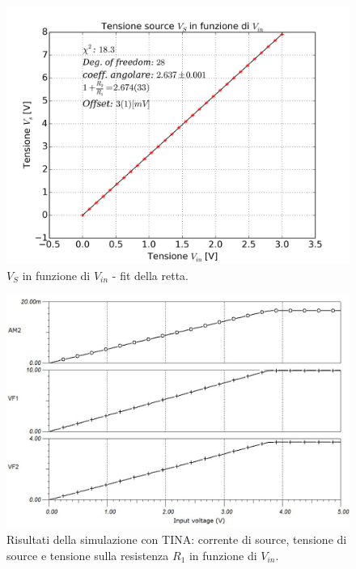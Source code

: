 \documentclass[journal, a4paper]{IEEEtran}
\begin{document}
\begin{figure}
\centering
\includegraphics[width=0.9\linewidth]{./es17_fit}
\caption{$V_S$ in funzione di $V_{in}$ - fit della retta.}
\label{fig:es17_fit}
\end{figure}


\begin{figure}
\centering
\includegraphics[width=0.8\linewidth]{./es_12_oldmosfet_noled_graph}
\caption{Risultati della simulazione con TINA: corrente di source, tensione di source e tensione sulla resistenza $R_1$ in funzione di $V_{in}$.}
\label{fig:es_12_oldmosfet_noled_graph}
\end{figure}
\end{document}
